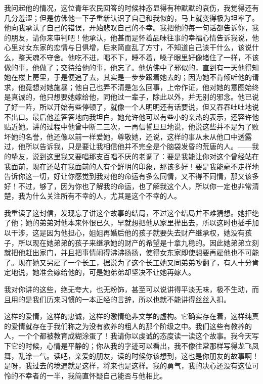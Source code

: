 \documentclass[12pt,oneside]{book}
\begin{document}
我问起他的情况，这位青年农民回答的时候神态显得有种默默的哀伤，我觉得还有几分羞涩；但是仿佛他一下子重新认识了自己和我似的，马上就变得极为坦率了。他向我承认了自己的错误，开始悲叹自己的不幸。我把他的每一句话都告诉你，我的朋友，请你来审判吧！他承认，他甚而是怀着品味往事的幸福心情告诉我说，他心里对女东家的恋情与日俱增，后来简直乱了方寸，不知道自己该干什么，该说什么，整天魂不守舍。他吃不进，喝不下，睡不着，嗓子眼里好像堵住了一样，不该做的事，他做了；交待给他的事，他忘了。他仿佛中了邪似的，直到有一天他得知她在楼上房里，于是便追了去，其实是一步步跟着她去的；因为她不肯倾听他的请求，他竟想对她施暴；他自己也弄不清是怎么回事，上帝作证，他对她的意图始终是真诚的，他只想要她嫁给他，同他过一辈子，除此以外，并无别的邪念。他已说了好一阵，所以开始有些停顿了，就像一个人明明还有话要说，但又吞吞吐吐地说不出口。最后他羞答答地向我坦白，她允许他可以有些小的亲热的表示，还容许他贴近她。讲的过程中他曾中断二三次，一再信誓旦旦地说，他说这些并不是为了败坏她的名誉，他还像以前一样爱她，尊敬她，还说，这样的事从未从他口中透露过，他所以告诉我，只是要让我相信他并不完全是个脑袋发昏的荒唐的人。——我的挚友，说到这里我又要唱那支百唱不厌的老调了：要是我能让你对这个曾经站在我面前，现在还站在我面前的人有个鲜明的印象，那该多好！要是我能毫不走样地告诉你这一切，好让你感觉到我对他的命运有多么同情，又不得不同情，那又该多好！不过，够了，因为你也了解我的命运，也了解我这个人，所以你一定也非常清楚，我为什么关注所有不幸的人，尤其是这个不幸的人。

我重读了这封信，发现忘了讲这个故事的结局，不过这个结局并不难猜想。她拒绝了他；她的弟弟对他本来怀恨已久，早就想把他从家里撵出去，所以这时也插手加以干涉，这是因为他担心，姐姐再婚后他的孩子就要失去财产继承权，她没有孩子，所以现在她弟弟的孩子来继承她的财产的希望是十拿九稳的。因此她弟弟立刻就把他赶出家门，并且把事情闹得沸沸扬扬，使得女东家即使想要再雇他也不可能了。现在她又另雇了一个长工，据说为了这个长工她又同弟弟吵翻了，有人十分肯定地说，她准会嫁给他的，可是她弟弟却坚决不让她再嫁人。

我对你讲的这些，绝无夸大，也无粉饰，甚至可以说讲得平淡无味，极不生动，而且用的是我们历来习惯的一本正经的言辞，所以也就不能讲得丝丝入扣。

这样的爱情，这样的忠诚，这样的激情绝非文学的虚构。它确实存在着，这样纯真的爱情就存在于我们称之为没有教养的粗人的那个阶级之中。我们这些有教养的人，一个个都被教育成糊涂蛋了！我请你以虔诚的态度读一读这个故事。我今天写下它的时候，心情是平静的；你从我的字迹可以看出，我不像往常那样写得龙飞凤舞，乱涂一气。读吧，亲爱的朋友，读的时候你该想到，这也是你朋友的故事啊！是呀，我过去的境遇就是这样，将来也是这样。我的勇气，我的决心还没有这位可怜的不幸者的一半，我简直怀疑自己能否与他相比。
　　
\end{document}
